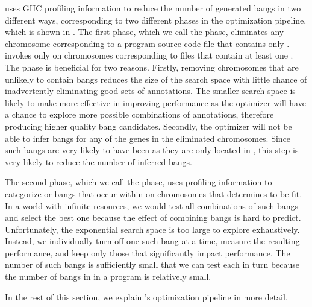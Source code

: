 \At{} uses GHC profiling information to reduce the
number of generated bangs in two different ways, corresponding to two
different phases in the optimization pipeline, which is shown in . 
The first phase, which we call the \preopt{} phase, eliminates
any chromosome corresponding to a program source code file that
contains only \coldspots{}. \At{} invokes \Ao{} only on chromosomes
corresponding to files that contain at least one \hotspot{}. The \preopt{}
phase is beneficial for two reasons. Firstly, removing
chromosomes that are unlikely to contain \useful{} bangs reduces the
size of the search space with little chance of inadvertently
eliminating good sets of annotations. The smaller search space is
likely to make \Ao{} more effective in improving performance as the 
optimizer will have a chance to explore more possible combinations
of annotations, therefore producing higher quality bang candidates. 
Secondly, the optimizer will not be able to
infer bangs for any of the genes in the eliminated chromosomes.  
Since such bangs are very likely to have been \useless{} as they
are only located in \coldspots{}, this step is very likely to 
reduce the number of inferred \useless{} bangs.

The second phase, which we call the \postopt{} phase, uses profiling
information to categorize \useless{} or \useful{} bangs that occur within \hotspots{} on
chromosomes that \Ao{} determines to be fit. In a world with infinite resources,
we would test all combinations of such bangs and select the best one
because the effect of combining bangs is hard to predict.
Unfortunately, the exponential search space is too large to explore
exhaustively. Instead, we individually turn off one such bang at a
time, measure the resulting performance, and keep only those that
significantly impact performance.  The number of such bangs is
sufficiently small that we can test each in turn because the number of
bangs in \hotspots{} in a program is relatively small.

In the rest of this section, we explain \At{}'s optimization pipeline
in more detail.

